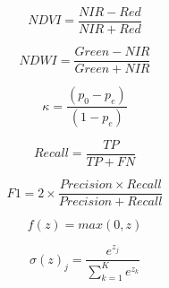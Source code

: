 %   
%   
%   
%   
%   
%   

\begin{equation}
    NDVI = \frac{NIR-Red} {NIR+Red}
\end{equation}

\begin{equation}
    NDWI = \frac{Green-NIR} {Green+NIR}
\end{equation}

\begin{equation}
    \kappa = \frac{(p_0-p_e)} {(1-p_e)}
\end{equation}

\begin{equation}
    Recall = \frac{TP} {TP+FN}
\end{equation}

\begin{equation}
    F1 = 2\times\frac{Precision\times Recall} {Precision+Recall}
\end{equation}

\begin{equation}
    f(z)=max(0,z)
\end{equation}

\begin{equation}
    \sigma(z)_j = \frac{e^{z_j}} {\sum_{k=1}^{K} e^{z_k}}
\end{equation}